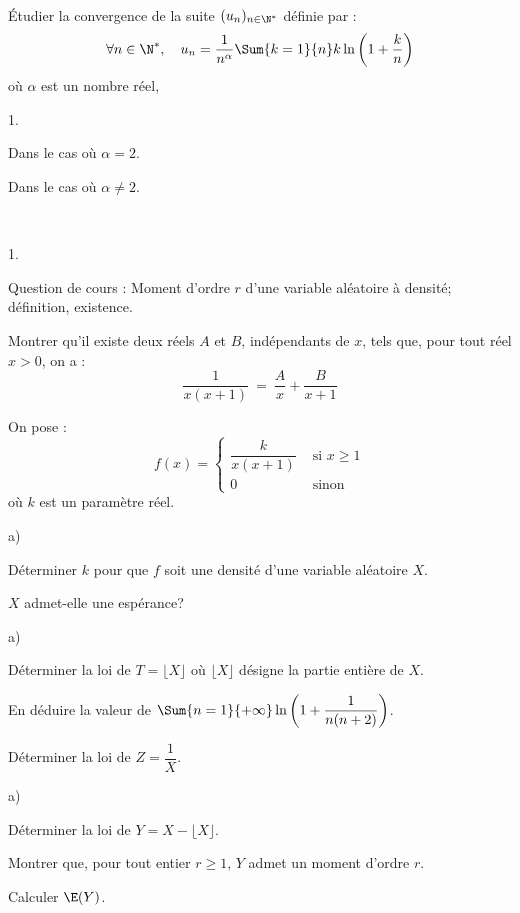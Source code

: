 \documentclass[11pt]{article}%
\begin{document}
\begin{exerciceSP}~\\
  Étudier la convergence de la suite $(u_n)_{n \in \N^* }$ définie par :
  \[
  \forall n \in \N^*,\ \ \ u_n = \frac{1}{n^{\alpha}} \Sum{k=1}{n} k
  \ln \left( 1 + \frac{k}{n} \right)
  \]
  où $\alpha$ est un nombre réel, \begin{noliste}{1.}
    \setlength{\itemsep}{2mm}
  \item Dans le cas où $\alpha = 2$.
  \item Dans le cas où $\alpha \neq 2$.

  \end{noliste}
\end{exerciceSP}


\newpage


\begin{exerciceAP}~
  \begin{noliste}{1.}
    \setlength{\itemsep}{2mm}
  \item Question de cours : Moment d'ordre $r$ d'une variable
    aléatoire à densité; définition, existence.
  \item Montrer qu'il existe deux réels $A$ et $B$, indépendants de
    $x$, tels que, pour tout réel $x > 0$, on a :
    \[
    \dfrac{1}{x (x+1)} \ = \ \dfrac{A}{x} + \dfrac{B}{x+1}
    \]
  \item On pose :
    \[
    f(x) = \left\{ 
      \begin{array}{cl} 
        \dfrac{k}{x(x+1)} & \text{ si } x \geq 1 
        \\[.4cm]
        0 & \text{ sinon } 
      \end{array} 
    \right.
    \]
    où $k$ est un paramètre réel. \begin{noliste}{a)}
    \setlength{\itemsep}{2mm}
    \item Déterminer $k$ pour que $f$ soit une densité d'une variable
      aléatoire $X$.
    \item $X$ admet-elle une espérance?
    \end{noliste}
  \item
    \begin{noliste}{a)}
    \setlength{\itemsep}{2mm}
    \item Déterminer la loi de $T = \lfloor X \rfloor$ où $\lfloor X
      \rfloor$ désigne la partie entière de $X$.
    \item En déduire la valeur de $\Sum{n=1}{+\infty} \ln \left( 1 +
        \dfrac{1}{n(n+2) } \right)$.
    \end{noliste}
  \item Déterminer la loi de $Z = \dfrac{1}{X}$.
  \item
    \begin{noliste}{a)}
    \setlength{\itemsep}{2mm}
    \item Déterminer la loi de $Y = X - \lfloor X \rfloor$. 
    \item Montrer que, pour tout entier $r \geq 1$, $Y$ admet un
      moment d'ordre $r$.
    \item Calculer $\E(Y)$. 
    \end{noliste} 
  \end{noliste}
\end{exerciceAP}
\end{document}
